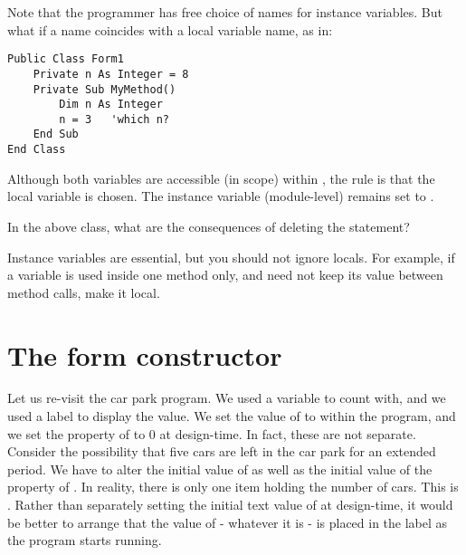 		Note that the programmer has free choice of names for instance variables. But what if a name coincides with a local variable name, as in:
		\begin{lstlisting}
Public Class Form1
	Private n As Integer = 8
	Private Sub MyMethod()
		Dim n As Integer
		n = 3	'which n?
	End Sub
End Class
		\end{lstlisting}
		Although both variables are accessible (in scope) within , the rule is that the local variable is chosen. The instance variable (module-level)  remains set to .

		\begin{stqb}
			\begin{STQ}
			\item	In the above  class, what are the consequences of deleting the  statement?
			\end{STQ}
		\end{stqb}
		Instance variables are essential, but you should not ignore locals. For example, if a variable is used inside one method only, and need not keep its value between method calls, make it local.


  \section{The form constructor}
	Let us re-visit the car park program. We used a variable  to count with, and we used a label to display the  value. We set the value of  to  within the program, and we set the  property of  to 0 at design-time. In fact, these are not separate. Consider the possibility that five cars are left in the car park for an extended period. We have to alter the initial value of  as well as the initial value of the  property of . In reality, there is only one item holding the number of cars. This is . Rather than separately setting the initial text value of  at design-time, it would be better to arrange that the value of  - whatever it is - is placed in the label as the program starts running.
		
